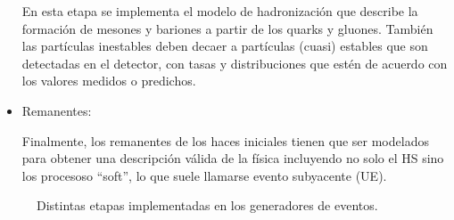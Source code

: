 \begin{itemize}
  En esta etapa se implementa el modelo de hadronización que describe la
  formación de mesones y bariones a partir de los quarks y gluones. También las
  partículas inestables deben decaer a partículas (cuasi) estables que son
  detectadas en el detector, con tasas y distribuciones que estén de acuerdo con
  los valores medidos o predichos.

\item Remanentes:

  Finalmente, los remanentes de los haces iniciales tienen que ser
  modelados para obtener una descripción válida de la física incluyendo
  no solo el HS sino los procesoso ``soft'', lo que suele llamarse evento subyacente (UE).

\end{itemize}


\begin{figure}[!htbp]
  \centering

  \scalebox{0.9}{}

  \caption{Distintas etapas implementadas en los generadores de eventos.}
  \label{fig:mc_event_generator}

\end{figure}



